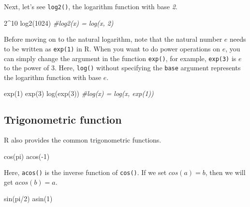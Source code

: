 \documentclass[
]{book}
\newenvironment{Shaded}{\begin{snugshade}}{\end{snugshade}}
\newcommand{\CommentTok}[1]{\textcolor[rgb]{0.56,0.35,0.01}{\textit{#1}}}
\newcommand{\DecValTok}[1]{\textcolor[rgb]{0.00,0.00,0.81}{#1}}
\newcommand{\FunctionTok}[1]{\textcolor[rgb]{0.00,0.00,0.00}{#1}}
\newcommand{\NormalTok}[1]{#1}
\newcommand{\SpecialCharTok}[1]{\textcolor[rgb]{0.00,0.00,0.00}{#1}}
\begin{document}
Next, let's see \texttt{log2()}, the logarithm function with base \emph{2}.

\begin{Shaded}
\begin{Highlighting}[]
\DecValTok{2}\SpecialCharTok{\^{}}\DecValTok{10}
\FunctionTok{log2}\NormalTok{(}\DecValTok{1024}\NormalTok{)  }\CommentTok{\#log2(x) = log(x, 2)}
\end{Highlighting}
\end{Shaded}

Before moving on to the natural logarithm, note that the natural number \(e\) needs to be written as \texttt{exp(1)} in R. When you want to do power operations on \(e\), you can simply change the argument in the function \texttt{exp()}, for example, \texttt{exp(3)} is \(e\) to the power of 3. Here, \texttt{log()} without specifying the \texttt{base} argument represents the logarithm function with base \(e\).

\begin{Shaded}
\begin{Highlighting}[]
\FunctionTok{exp}\NormalTok{(}\DecValTok{1}\NormalTok{)      }
\FunctionTok{exp}\NormalTok{(}\DecValTok{3}\NormalTok{)}
\FunctionTok{log}\NormalTok{(}\FunctionTok{exp}\NormalTok{(}\DecValTok{3}\NormalTok{))  }\CommentTok{\#log(x) = log(x, exp(1))}
\end{Highlighting}
\end{Shaded}

\hypertarget{trigonometric-function}{%
\subsection{Trigonometric function}\label{trigonometric-function}}

R also provides the common trigonometric functions.

\begin{Shaded}
\begin{Highlighting}[]
\FunctionTok{cos}\NormalTok{(pi)}
\FunctionTok{acos}\NormalTok{(}\SpecialCharTok{{-}}\DecValTok{1}\NormalTok{)}
\end{Highlighting}
\end{Shaded}

Here, \texttt{acos()} is the inverse function of \texttt{cos()}. If we set \(cos(a) = b\), then we will get \(acos(b) = a\).

\begin{Shaded}
\begin{Highlighting}[]
\FunctionTok{sin}\NormalTok{(pi}\SpecialCharTok{/}\DecValTok{2}\NormalTok{)}
\FunctionTok{asin}\NormalTok{(}\DecValTok{1}\NormalTok{)}
\end{Highlighting}
\end{Shaded}
\end{document}
